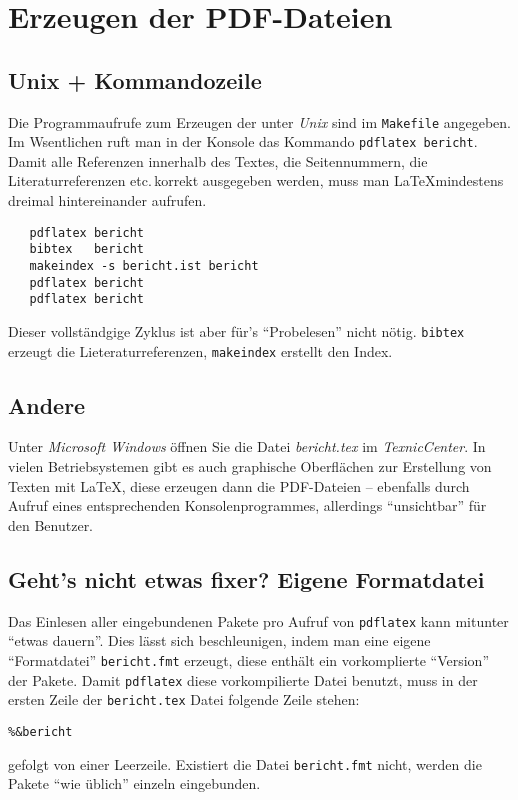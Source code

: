 
\section{Erzeugen der PDF-Dateien}

\subsection{Unix + Kommandozeile}
Die Programmaufrufe zum Erzeugen der  unter \emph{Unix}
sind im \texttt{Makefile} angegeben. Im Wsentlichen ruft man in der Konsole das Kommando
\texttt{pdflatex bericht}. Damit alle Referenzen innerhalb des Textes, die Seitennummern,
die Literaturreferenzen etc.\,korrekt ausgegeben werden, muss man \LaTeX mindestens dreimal hintereinander aufrufen.
\begin{verbatim}
   pdflatex bericht
   bibtex   bericht
   makeindex -s bericht.ist bericht
   pdflatex bericht
   pdflatex bericht
\end{verbatim}
Dieser vollständgige Zyklus ist aber für's \enquote{Probelesen} nicht nötig.
\texttt{bibtex}  erzeugt die Lieteraturreferenzen, \texttt{makeindex} erstellt den Index.

\subsection{Andere}
Unter \emph{Microsoft Windows} öffnen Sie die Datei \emph{bericht.tex} im \emph{TexnicCenter}.
In vielen Betriebsystemen gibt es auch graphische Oberflächen zur Erstellung von Texten mit \LaTeX,
diese erzeugen dann die PDF-Dateien -- ebenfalls durch Aufruf eines entsprechenden
Konsolenprogrammes, allerdings \enquote{unsichtbar} für den Benutzer.

\subsection{Geht's nicht etwas fixer? Eigene Formatdatei}
Das Einlesen aller eingebundenen Pakete pro Aufruf von \texttt{pdflatex} kann mitunter
\enquote{etwas dauern}. Dies lässt sich beschleunigen, indem man eine eigene \enquote{Formatdatei}
 \texttt{bericht.fmt} erzeugt, diese enthält ein vorkomplierte \enquote{Version}
der Pakete. Damit \texttt{pdflatex} diese vorkompilierte Datei benutzt, muss in der ersten Zeile der
\texttt{bericht.tex} Datei folgende Zeile stehen:
\begin{verbatim}
%&bericht
\end{verbatim}
gefolgt von einer Leerzeile. Existiert die Datei \texttt{bericht.fmt} nicht, werden die Pakete
\enquote{wie üblich} einzeln eingebunden.

